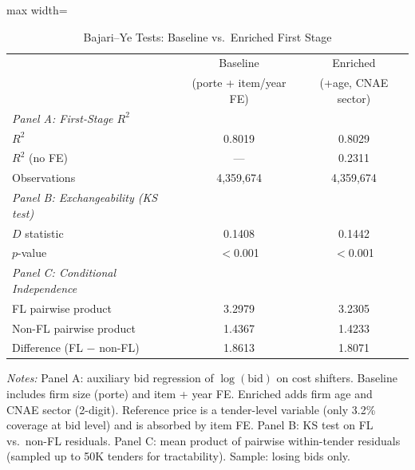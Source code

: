 \begin{table}[htbp]
\centering
\caption{Bajari--Ye Tests: Baseline vs.\ Enriched First Stage}
\label{tab:bajari_ye_enriched}
\begin{adjustbox}{max width=\textwidth}
\begin{threeparttable}
\small
\begin{tabular}{lcc}
\toprule
 & Baseline & Enriched \\
 & (porte + item/year FE) & (+age, CNAE sector) \\
\midrule
\textit{Panel A: First-Stage $R^2$} & & \\
\quad $R^2$ & 0.8019 & 0.8029 \\
\quad $R^2$ (no FE) & --- & 0.2311 \\
\quad Observations & 4,359,674 & 4,359,674 \\
[6pt]
\textit{Panel B: Exchangeability (KS test)} & & \\
\quad $D$ statistic & 0.1408 & 0.1442 \\
\quad $p$-value & $<$0.001 & $<$0.001 \\
[6pt]
\textit{Panel C: Conditional Independence} & & \\
\quad FL pairwise product & 3.2979 & 3.2305 \\
\quad Non-FL pairwise product & 1.4367 & 1.4233 \\
\quad Difference (FL $-$ non-FL) & 1.8613 & 1.8071 \\
\bottomrule
\end{tabular}
\begin{tablenotes}
\small
\item \textit{Notes:} Panel A: auxiliary bid regression of $\log(\text{bid})$ on cost shifters. Baseline includes firm size (porte) and item + year FE. Enriched adds firm age and CNAE sector (2-digit). Reference price is a tender-level variable (only 3.2\% coverage at bid level) and is absorbed by item FE. Panel B: KS test on FL vs.\ non-FL residuals. Panel C: mean product of pairwise within-tender residuals (sampled up to 50K tenders for tractability). Sample: losing bids only.
\end{tablenotes}
\end{threeparttable}
\end{adjustbox}
\end{table}

